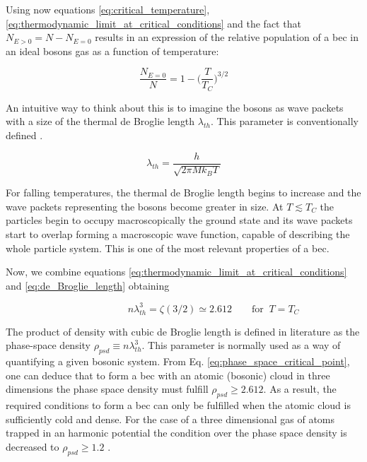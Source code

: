 Using now equations \eqref{eq:critical_temperature}, \eqref{eq:thermodynamic_limit_at_critical_conditions} and the fact that $N_{E>0} = N - N_{E=0}$ results in an expression of the relative population of a \ac{bec} in an ideal bosons gas as a function of temperature:

\begin{equation}\label{eq:bec_relative_population}
\frac{N_{E=0}}{N} = 1 - \bigg(\frac{T}{T_C}\bigg)^{3/2}
\end{equation}

An intuitive way to think about this is to imagine the bosons as wave packets with a size of the thermal de Broglie length $\lambda_{th}$. This parameter is conventionally defined \cite{deBroglie1970}.

\begin{equation}\label{eq:de_Broglie_length}
\lambda_{th} = \frac{h}{\sqrt{2\pi Mk_B T}}
\end{equation}

For falling temperatures, the thermal de Broglie length begins to increase and the wave packets representing the bosons become greater in size. At $T\lesssim T_C$ the particles begin to occupy macroscopically the ground state and its wave packets start to overlap forming a macroscopic wave function, capable of describing the whole particle system. This is one of the most relevant properties of a \ac{bec}.

Now, we combine equations \ref{eq:thermodynamic_limit_at_critical_conditions} and \ref{eq:de_Broglie_length} obtaining

\begin{equation}\label{eq:phase_space_critical_point}
\qquad\qquad\qquad n \lambda_{th}^3 = \zeta(3/2) \simeq 2.612 \qquad \textrm{for } \ T=T_C
\end{equation}

The product of density with cubic de Broglie length is defined in literature as the phase-space density $\rho_{psd} \equiv n \lambda_{th}^3$. This parameter is normally used as a way of quantifying a given bosonic system. From Eq. \eqref{eq:phase_space_critical_point}, one can deduce that to form a \ac{bec} with an atomic (bosonic) cloud in three dimensions the phase space density must fulfill $\rho_{psd} \geq 2.612$. As a result, the required conditions to form a \ac{bec} can only be fulfilled when the atomic cloud is sufficiently cold and dense. For the case of a three dimensional gas of atoms trapped in an harmonic potential the condition over the phase space density is decreased to $\rho_{psd} \geq 1.2$ \cite{Pethick2008}. 

